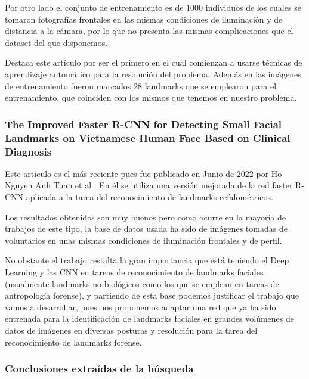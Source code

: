                 \medskip

                \noindent Por otro lado el conjunto de entrenamiento es de $1000$ individuos de los cuales se tomaron fotografías frontales en las mismas condiciones de iluminación y de distancia a la cámara, por lo que no presenta las mismas complicaciones que el dataset del que disponemos. 

                \medskip

                \noindent Destaca este artículo por ser el primero en el cual comienzan a usarse técnicas de aprendizaje automático para la resolución del problema. Además en las imágenes de entrenamiento fueron marcados 28 landmarks que se emplearon para el entrenamiento, que coinciden con los mismos que tenemos en nuestro problema.

            \subsubsection*{The Improved Faster R-CNN for Detecting Small Facial Landmarks on Vietnamese Human Face Based on Clinical Diagnosis}
            
                \noindent Este artículo es el más reciente pues fue publicado en Junio de $2022$ por Ho Nguyen Anh Tuan et al \cite{ImprovedfasterRCNN}. En él se utiliza una versión mejorada de la red faster R-CNN aplicada a la tarea del reconocimiento de landmarks cefalométricos. 

                \medskip

                \noindent Los resultados obtenidos son muy buenos pero como ocurre en la mayoría de trabajos de este tipo, la base de datos usada ha sido de imágenes tomadas de voluntarios en unas mismas condiciones de iluminación frontales y de perfil. 

                \medskip

                \noindent No obstante el trabajo restalta la gran importancia que está teniendo el Deep Learning y las CNN en tareas de reconocimiento de landmarks faciales (usualmente landmarks no biológicos como los que se emplean en tareas de antropología forense), y partiendo de esta base podemos justificar el trabajo que vamos a desarrollar, pues nos proponemos adaptar una red que ya ha sido entrenada para la identificación de landmarks faciales en grandes volúmenes de datos de imágenes en diversas posturas y resolución para la tarea del reconocimiento de landmarks forense.

            \subsubsection*{Conclusiones extraídas de la búsqueda}

